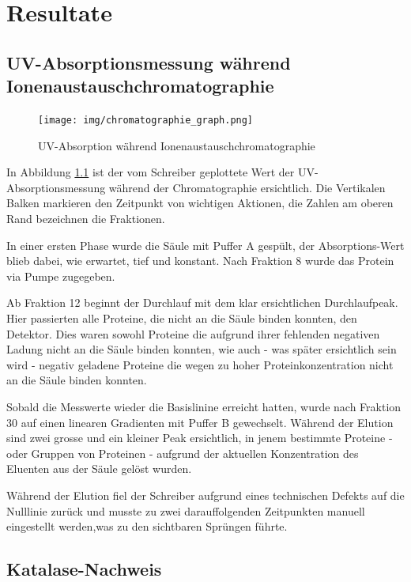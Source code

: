 \documentclass[a4paper,german]{scrreprt}
\begin{document}
\chapter{Resultate}

\section{UV-Absorptionsmessung während Ionenaustauschchromatographie}

\begin{figure}[h]
	\centering
	\texttt{[image: img/chromatographie\_graph.png]}
	\caption{UV-Absorption während Ionenaustauschchromatographie}
	\label{fig:chrom_graph}
\end{figure}

In Abbildung \ref{fig:chrom_graph} ist der vom Schreiber geplottete Wert der
UV-Absorptionsmessung während der Chromatographie ersichtlich. Die Vertikalen
Balken markieren den Zeitpunkt von wichtigen Aktionen, die Zahlen am oberen
Rand bezeichnen die Fraktionen.

In einer ersten Phase wurde die Säule mit Puffer A gespült, der
Absorptions-Wert blieb dabei, wie erwartet, tief und konstant. Nach Fraktion 8
wurde das Protein via Pumpe zugegeben.

Ab Fraktion 12 beginnt der Durchlauf mit dem klar ersichtlichen
Durchlaufpeak. Hier passierten alle Proteine, die nicht an die Säule binden
konnten, den Detektor. Dies waren sowohl Proteine die aufgrund ihrer fehlenden
negativen Ladung nicht an die Säule binden konnten, wie auch - was später
ersichtlich sein wird - negativ geladene Proteine die wegen zu hoher
Proteinkonzentration nicht an die Säule binden konnten.

Sobald die Messwerte wieder die Basislinine erreicht hatten, wurde nach
Fraktion 30 auf einen linearen Gradienten mit Puffer B gewechselt. Während der
Elution sind zwei grosse und ein kleiner Peak ersichtlich, in jenem bestimmte
Proteine - oder Gruppen von Proteinen - aufgrund der aktuellen Konzentration
des Eluenten aus der Säule gelöst wurden.

Während der Elution fiel der Schreiber aufgrund eines technischen Defekts auf
die Nulllinie zurück und musste zu zwei darauffolgenden Zeitpunkten manuell
eingestellt werden,was zu den sichtbaren Sprüngen führte.

\section{Katalase-Nachweis}
\end{document}
